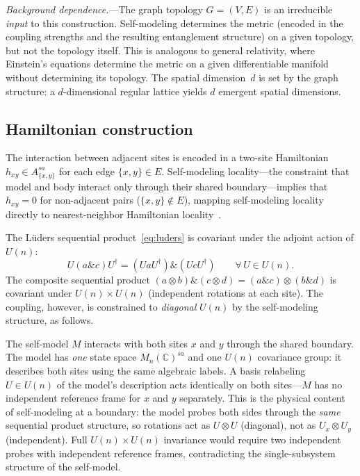 \emph{Background dependence.}---The graph topology $G = (V, E)$ is an
irreducible \emph{input} to this construction.  Self-modeling
determines the metric (encoded in the coupling strengths and the
resulting entanglement structure) on a given topology, but not the
topology itself.  This is analogous to general relativity, where
Einstein's equations determine the metric on a given differentiable
manifold without determining its topology.  The spatial dimension~$d$
is set by the graph structure: a $d$-dimensional regular lattice
yields $d$ emergent spatial dimensions.

\subsection{Hamiltonian construction}
\label{sec:hamiltonian}

The interaction between adjacent sites is encoded in a two-site
Hamiltonian $h_{xy} \in A_{\{x,y\}}^{sa}$ for each edge
$\{x, y\} \in E$.  Self-modeling locality---the constraint that model
and body interact only through their shared boundary---implies that
$h_{xy} = 0$ for non-adjacent pairs ($\{x,y\} \notin E$), mapping
self-modeling locality directly to nearest-neighbor Hamiltonian
locality~\cite{Paper5}.

The L\"uders sequential product~\eqref{eq:luders} is covariant under
the adjoint action of $U(n)$:
\begin{equation}
  U(a \mathbin{\&} c)U^\dagger = (UaU^\dagger) \mathbin{\&} (UcU^\dagger)
  \qquad \forall\, U \in U(n).
  \label{eq:covariance}
\end{equation}
The composite sequential product
$(a \otimes b) \mathbin{\&} (c \otimes d) = (a \mathbin{\&} c) \otimes
(b \mathbin{\&} d)$ is covariant under $U(n) \times U(n)$ (independent
rotations at each site).  The coupling, however, is constrained to
\emph{diagonal} $U(n)$ by the self-modeling structure, as follows.

The self-model $M$ interacts with both sites $x$ and $y$ through the
shared boundary.  The model has \emph{one} state space
$M_n(\mathbb{C})^{sa}$ and one $U(n)$ covariance group: it describes
both sites using the same algebraic labels.  A basis relabeling
$U \in U(n)$ of the model's description acts identically on both
sites---$M$ has no independent reference frame for $x$ and $y$
separately.  This is the physical content of self-modeling at a
boundary: the model probes both sides through the \emph{same} sequential
product structure, so rotations act as $U \otimes U$ (diagonal), not as
$U_x \otimes U_y$ (independent).  Full $U(n) \times U(n)$ invariance
would require two independent probes with independent reference frames,
contradicting the single-subsystem structure of the self-model.

